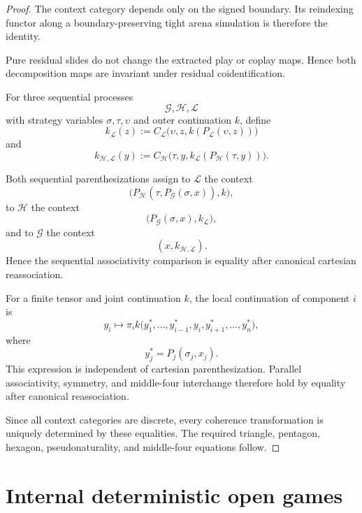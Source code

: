 \begin{proof}
The context category depends only on the signed boundary. Its reindexing functor along a
boundary-preserving tight arena simulation is therefore the identity.

Pure residual slides do not change the extracted play or coplay maps. Hence both decomposition maps
are invariant under residual coidentification.

For three sequential processes
\[
  \mathcal G,\mathcal H,\mathcal L
\]
with strategy variables \(\sigma,\tau,\upsilon\) and outer continuation \(k\), define
\[
  k_{\mathcal L}(z)
  :=
  C_{\mathcal L}
  \bigl(
    \upsilon,
    z,
    k(P_{\mathcal L}(\upsilon,z))
  \bigr)
\]
and
\[
  k_{\mathcal H,\mathcal L}(y)
  :=
  C_{\mathcal H}
  \bigl(
    \tau,
    y,
    k_{\mathcal L}(P_{\mathcal H}(\tau,y))
  \bigr).
\]

Both sequential parenthesizations assign to \(\mathcal L\) the context
\[
  \bigl(
    P_{\mathcal H}
    (\tau,P_{\mathcal G}(\sigma,x)),
    k
  \bigr),
\]
to \(\mathcal H\) the context
\[
  \bigl(
    P_{\mathcal G}(\sigma,x),
    k_{\mathcal L}
  \bigr),
\]
and to \(\mathcal G\) the context
\[
  (x,k_{\mathcal H,\mathcal L}).
\]
Hence the sequential associativity comparison is equality after canonical cartesian
reassociation.

For a finite tensor and joint continuation \(k\), the local continuation of component \(i\) is
\[
  y_i
  \longmapsto
  \pi_i
  k
  \bigl(
    y_1^\ast,\ldots,y_{i-1}^\ast,
    y_i,
    y_{i+1}^\ast,\ldots,y_n^\ast
  \bigr),
\]
where
\[
  y_j^\ast=P_j(\sigma_j,x_j).
\]
This expression is independent of cartesian parenthesization. Parallel associativity, symmetry, and
middle-four interchange therefore hold by equality after canonical reassociation.

Since all context categories are discrete, every coherence transformation is uniquely determined by
these equalities. The required triangle, pentagon, hexagon, pseudonaturality, and middle-four
equations follow.
\end{proof}

\section{Internal deterministic open games}
\label{sec:internal-open-games}

